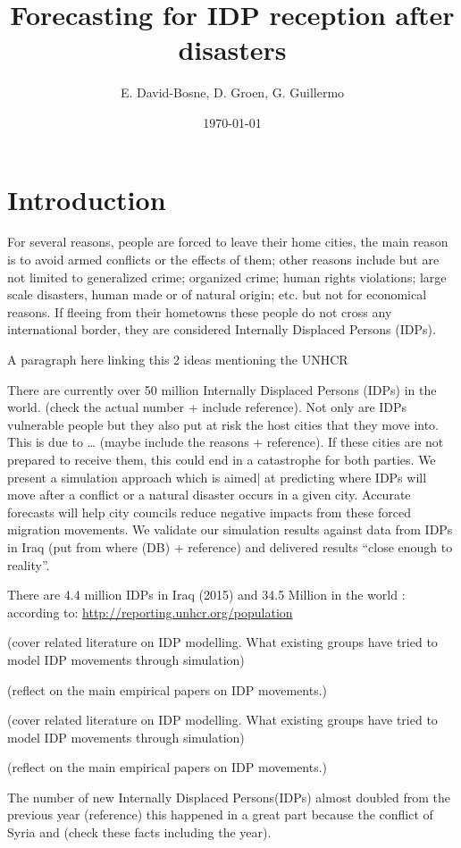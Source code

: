 \documentclass[11pt]{article}
\author{E. David-Bosne, D. Groen, G. Guillermo}
\date{\today}
\title{Forecasting for IDP reception after disasters}
\begin{document}
\maketitle
\tableofcontents


\section{Introduction}
\label{sec-1}
For several reasons,  people are forced to leave their home cities, the main reason is to avoid armed conflicts or the effects of them; other reasons include but are not limited to generalized crime; organized crime; human rights violations; large scale disasters, human made or of natural origin; etc. but not for economical reasons. If fleeing from their hometowns these people do not cross any international border, they are considered Internally Displaced Persons (IDPs).

A paragraph here linking this 2 ideas mentioning  the UNHCR

There are currently over 50 million Internally Displaced Persons (IDPs) in the world. (check the actual number + include reference). Not only are IDPs vulnerable people but they also put at risk the host cities that they move into. This is due to … (maybe include the reasons + reference). If these cities are not prepared to receive them, this could end in a catastrophe for both parties. We present a simulation approach which is aimed| at predicting where IDPs will move  after a conflict or a natural disaster occurs in a given city. Accurate forecasts will help city councils  reduce negative impacts from these forced migration movements. We validate our simulation results against data from IDPs in Iraq (put from where (DB) + reference) and delivered results “close enough to reality”.

There are 4.4 million IDPs in Iraq (2015) and 34.5 Million in the world : according to: \url{http://reporting.unhcr.org/population}

(cover related literature on IDP modelling. What existing groups have tried to model IDP movements through simulation)

(reflect on the main empirical papers on IDP movements.)

(cover related literature on IDP modelling. What existing groups have tried to model IDP movements through simulation)

(reflect on the main empirical papers on IDP movements.)

The number of new Internally Displaced Persons(IDPs) almost doubled from the previous year (reference) this happened in a great part because the conflict of Syria and (check these facts including the year).
\end{document}
